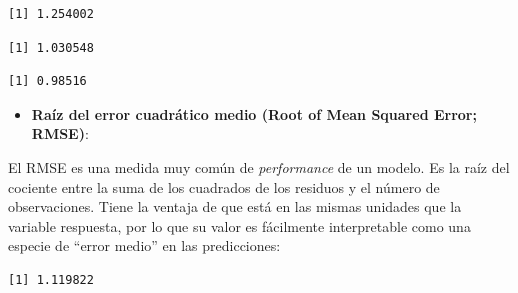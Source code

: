 \documentclass[
  letterpaper,
  DIV=11,
  numbers=noendperiod]{scrreprt}
\newenvironment{Shaded}{\begin{snugshade}}{\end{snugshade}}
\newcommand{\CommentTok}[1]{\textcolor[rgb]{0.37,0.37,0.37}{#1}}
\newcommand{\DecValTok}[1]{\textcolor[rgb]{0.68,0.00,0.00}{#1}}
\newcommand{\FunctionTok}[1]{\textcolor[rgb]{0.28,0.35,0.67}{#1}}
\newcommand{\NormalTok}[1]{\textcolor[rgb]{0.00,0.23,0.31}{#1}}
\newcommand{\SpecialCharTok}[1]{\textcolor[rgb]{0.37,0.37,0.37}{#1}}
\providecommand{\tightlist}{%
  \setlength{\itemsep}{0pt}\setlength{\parskip}{0pt}}\usepackage{longtable,booktabs,array}
\begin{document}
\begin{verbatim}
[1] 1.254002
\end{verbatim}

\begin{Shaded}
\end{Shaded}

\begin{verbatim}
[1] 1.030548
\end{verbatim}

\begin{Shaded}
\end{Shaded}

\begin{verbatim}
[1] 0.98516
\end{verbatim}

\begin{itemize}
\tightlist
\item
  \textbf{Raíz del error cuadrático medio (Root of Mean Squared Error;
  RMSE)}:
\end{itemize}

El RMSE es una medida muy común de \emph{performance} de un modelo. Es
la raíz del cociente entre la suma de los cuadrados de los residuos y el
número de observaciones. Tiene la ventaja de que está en las mismas
unidades que la variable respuesta, por lo que su valor es fácilmente
interpretable como una especie de ``error medio'' en las predicciones:

\begin{Shaded}
\end{Shaded}

\begin{verbatim}
[1] 1.119822
\end{verbatim}
\end{document}
